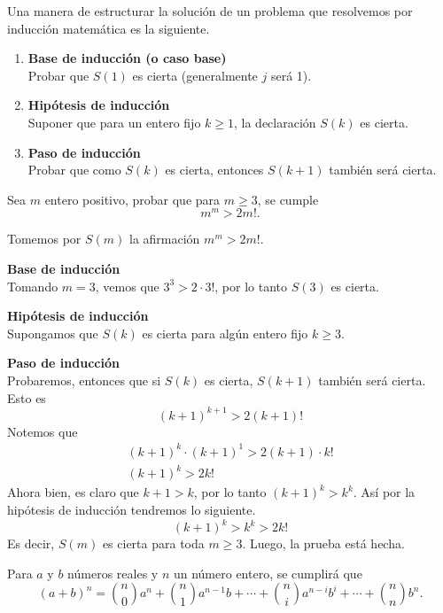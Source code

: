 Una manera de estructurar la solución de un problema que resolvemos por inducción matemática es la siguiente.
\begin{enumerate}
    \item \textbf{Base de inducción (o caso base)}\\
    Probar que $S(1)$ es cierta (generalmente $j$ será 1).

    \item \textbf{Hipótesis de inducción}\\
    Suponer que para un entero fijo $k \geq 1$, la declaración $S(k)$ es cierta.

    \item \textbf{Paso de inducción}\\
    Probar que como $S(k)$ es cierta, entonces $S(k + 1)$ también será cierta.
\end{enumerate}

\begin{example}
    Sea $m$ entero positivo, probar que para $m \geq 3$, se cumple \[m^m > 2m!.\]
\end{example}

\begin{solution}
    Tomemos por $S(m)$ la afirmación $m^m > 2m!$.

    \textbf{Base de inducción}\\
    Tomando $m = 3$, vemos que $3^3 > 2\cdot3!$, por lo tanto $S(3)$ es cierta.

    \textbf{Hipótesis de inducción}\\
    Supongamos que $S(k)$ es cierta para algún entero fijo $k\geq 3$.

    \textbf{Paso de inducción}\\
    Probaremos, entonces que si $S(k)$ es cierta, $S(k + 1)$ también será cierta.
    Esto es
    \[(k + 1)^{k + 1} > 2(k + 1)!\]
    Notemos que
    \begin{gather*}
    (k + 1)^{k}\cdot(k + 1)^1 > 2(k + 1)\cdot k!\\
    (k + 1)^k > 2k!
    \end{gather*}
    Ahora bien, es claro que $k + 1 > k$, por lo tanto $(k + 1)^k > k^k$.
    Así por la hipótesis de inducción tendremos lo siguiente.
    \[(k + 1)^k > k^k > 2k!\]
    Es decir, $S(m)$ es cierta para toda $m\geq 3$.
    Luego, la prueba está hecha.
\end{solution}

\begin{theorem}
    Para $a$ y $b$ números reales y $n$ un número entero, se cumplirá que
    \[(a + b)^n = \binom{n}{0}a^n + \binom{n}{1}a^{n - 1}b + \cdots + \binom{n}{i}a^{n - i}b^i + \cdots + \binom{n}{n}b^n.\]
\end{theorem}

